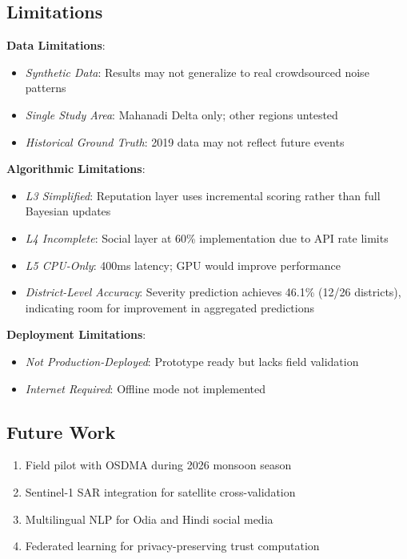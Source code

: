 \documentclass[conference]{IEEEtran}
\begin{document}
\subsection{Limitations}

\textbf{Data Limitations}:
\begin{itemize}
    \item \textit{Synthetic Data}: Results may not generalize to real crowdsourced noise patterns
    \item \textit{Single Study Area}: Mahanadi Delta only; other regions untested
    \item \textit{Historical Ground Truth}: 2019 data may not reflect future events
\end{itemize}

\textbf{Algorithmic Limitations}:
\begin{itemize}
    \item \textit{L3 Simplified}: Reputation layer uses incremental scoring rather than full Bayesian updates
    \item \textit{L4 Incomplete}: Social layer at 60\% implementation due to API rate limits
    \item \textit{L5 CPU-Only}: 400ms latency; GPU would improve performance
    \item \textit{District-Level Accuracy}: Severity prediction achieves 46.1\% (12/26 districts), indicating room for improvement in aggregated predictions
\end{itemize}

\textbf{Deployment Limitations}:
\begin{itemize}
    \item \textit{Not Production-Deployed}: Prototype ready but lacks field validation
    \item \textit{Internet Required}: Offline mode not implemented
\end{itemize}

\subsection{Future Work}
\begin{enumerate}
    \item Field pilot with OSDMA during 2026 monsoon season
    \item Sentinel-1 SAR integration for satellite cross-validation
    \item Multilingual NLP for Odia and Hindi social media
    \item Federated learning for privacy-preserving trust computation
\end{enumerate}
\end{document}
